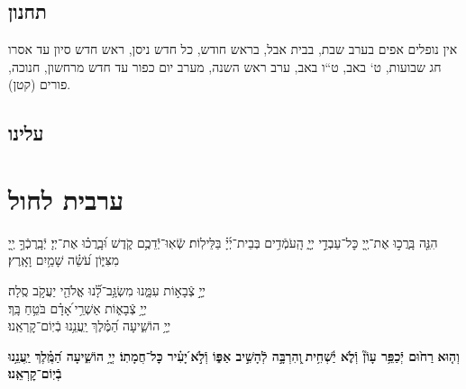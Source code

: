 \documentclass[twoside, openany, parskip=half, 11pt]{book}
\begin{document}
\section*{ תחנון }

\begin{scriptsize}
\textsf{אין נופלים אפים בערב שבת, בבית אבל, בראש חודש, כל חדש ניסן, ראש חדש סיון עד אסרו חג שבועות, ט` באב, ט``ו באב, ערב ראש השנה, מערב יום כפור עד חדש מרחשון, חנוכה, פורים (קטן).}

\end{scriptsize}


\nefilasapayim

\nextpage
\shomeryisroel

\fullkaddish

\vspace{\baselineskip}

\label{mincha aleinu}
\section*{ עלינו }


\aleinu


\vfill

\quad{}\quad{}

\chapter[ערבית לחול]{ ערבית לחול }

הִנֵּ֤ה בָּֽרֲכ֣וּ אֶת־יְ֖יָ כׇּל־עַבְדֵ֣י יְיָ֑ הָֽעֹמְֿדִ֥ים בְּבֵית־יְ֜יָ֗ בַּלֵּילֽוֹת׃ שְֿׂאֽוּ־יְֿֿדֵכֶ֥ם קֹ֑דֶשׁ וּ֝בָֽרֲכ֗וּ אֶת־יְיָ׃ יְֿבָֽרֶכְֿךָ֣ יְ֖יָ מִצִּיּ֑וֹן עֹ֝שֵׂ֗ה שָׁמַ֥יִם וָאָֽרֶץ׃

יְיָ֣ צְֿבָא֣וֹת עִמָּ֑נוּ מִשְׂגָּ֥ב־לָ֝֗נוּ אֱלֹהֵ֖י יַעֲקֹ֣ב סֶֽלָה׃  \hfill
{} \\
יְיָ֥ צְֿבָא֑וֹת אַשְׁרֵ֥י ֝אָדָ֗ם בֹּטֵ֥חַ בָּֽךְ׃  \hfill
{} \\
יְיָ֥ הוֹשִׁ֑יעָה הַ֝מֶּ֗לֶךְ יַֽעֲנֵ֥נוּ בְֿיֽוֹם־קׇרְאֵֽנוּ׃  \hfill {}


\halfkaddish


\textbf{וְה֤וּא}\textbf{
רַח֙וּם יְֿכַפֵּ֥ר עָוֹן֘ וְֿלֹ֢א יַ֫שְׁחִ֥ית ֖וְהִרְבָּ֣ה לְֿהָשִׁ֣יב אַפּ֑וֹ וְֿלֹ֣א ֝יָעִ֗יר כׇּל־חֲמָתֽוֹ׃ יְיָ֥ הוֹשִׁ֑יעָה הַ֝מֶּֽ֗לֶךְ יַֽעֲנֵ֥נוּ בְֿיֽוֹם־קׇרְאֵֽנוּ׃}
\end{document}
